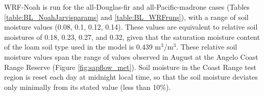 WRF-Noah is run for the all-Douglas-fir and all-Pacific-madrone cases (Tables \ref{table:BL_NoahJarvisparams} and \ref{table:BL_WRFruns}), with a range of soil moisture values (0.08, 0.1, 0.12, 0.14).  These values are equivalent to relative soil moistures of 0.18, 0.23, 0.27, and 0.32, given that the saturation moisture content of the loam soil type used in the model is 0.439 m$^3$/m$^3$.  These relative soil moisture values span the range of values observed in August at the Angelo Coast Range Reserve (Figure \ref{fig:sapflow_met}).  Soil moisture in the Coast Range test region is reset each day at midnight local time, so that the soil moisture deviates only minimally from its stated value (less than 10\%).
